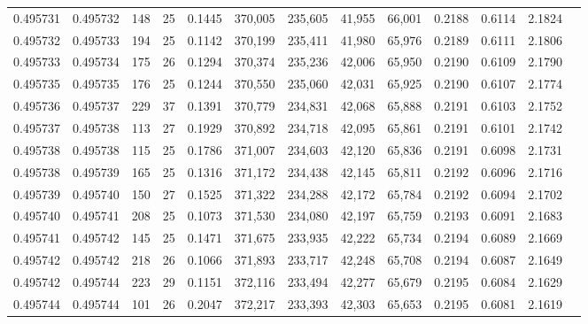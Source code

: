 \begin{tabular}{rrrrrrrrrrrrr}
0.495731 & 0.495732 & 148 &  25 &                                     0.1445 & 370,005 & 235,605 &  41,955 &  66,001 & 0.2188 & 0.6114 & 2.1824 \\
0.495732 & 0.495733 & 194 &  25 &                                     0.1142 & 370,199 & 235,411 &  41,980 &  65,976 & 0.2189 & 0.6111 & 2.1806 \\
0.495733 & 0.495734 & 175 &  26 &                                     0.1294 & 370,374 & 235,236 &  42,006 &  65,950 & 0.2190 & 0.6109 & 2.1790 \\
0.495735 & 0.495735 & 176 &  25 &                                     0.1244 & 370,550 & 235,060 &  42,031 &  65,925 & 0.2190 & 0.6107 & 2.1774 \\
0.495736 & 0.495737 & 229 &  37 &                                     0.1391 & 370,779 & 234,831 &  42,068 &  65,888 & 0.2191 & 0.6103 & 2.1752 \\
0.495737 & 0.495738 & 113 &  27 &                                     0.1929 & 370,892 & 234,718 &  42,095 &  65,861 & 0.2191 & 0.6101 & 2.1742 \\
0.495738 & 0.495738 & 115 &  25 &                                     0.1786 & 371,007 & 234,603 &  42,120 &  65,836 & 0.2191 & 0.6098 & 2.1731 \\
0.495738 & 0.495739 & 165 &  25 &                                     0.1316 & 371,172 & 234,438 &  42,145 &  65,811 & 0.2192 & 0.6096 & 2.1716 \\
0.495739 & 0.495740 & 150 &  27 &                                     0.1525 & 371,322 & 234,288 &  42,172 &  65,784 & 0.2192 & 0.6094 & 2.1702 \\
0.495740 & 0.495741 & 208 &  25 &                                     0.1073 & 371,530 & 234,080 &  42,197 &  65,759 & 0.2193 & 0.6091 & 2.1683 \\
0.495741 & 0.495742 & 145 &  25 &                                     0.1471 & 371,675 & 233,935 &  42,222 &  65,734 & 0.2194 & 0.6089 & 2.1669 \\
0.495742 & 0.495742 & 218 &  26 &                                     0.1066 & 371,893 & 233,717 &  42,248 &  65,708 & 0.2194 & 0.6087 & 2.1649 \\
0.495742 & 0.495744 & 223 &  29 &                                     0.1151 & 372,116 & 233,494 &  42,277 &  65,679 & 0.2195 & 0.6084 & 2.1629 \\
0.495744 & 0.495744 & 101 &  26 &                                     0.2047 & 372,217 & 233,393 &  42,303 &  65,653 & 0.2195 & 0.6081 & 2.1619 \\

\end{tabular}
